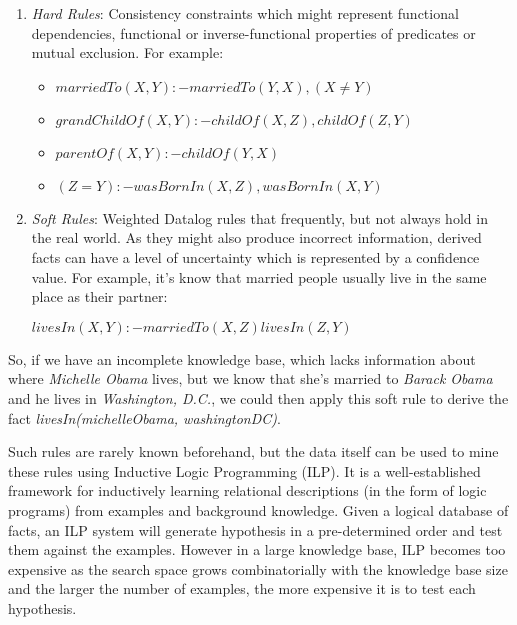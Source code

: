 \begin{enumerate}
 \item \emph{Hard Rules}: Consistency constraints which might represent functional dependencies, functional or
inverse-functional properties of predicates or mutual exclusion. For example:
    \begin{itemize}
      \item $ marriedTo(X,Y) :- marriedTo(Y,X),(X \neq Y)$
      \item $ grandChildOf(X,Y) :- childOf(X,Z),childOf(Z,Y)$
      \item $ parentOf(X,Y) :- childOf(Y,X)$
      \item $ (Z=Y) :- wasBornIn(X,Z),wasBornIn(X,Y)$
    \end{itemize}

 \item \emph{Soft Rules}: Weighted Datalog rules that frequently, but not always hold in the real world. As they
might also produce incorrect information, derived facts can have a level of uncertainty which is represented by a
confidence value. For example, it's know that married people usually live in the same place as their partner:
    \begin{center}
      $ livesIn(X,Y) :- marriedTo(X,Z)livesIn(Z,Y)$
    \end{center}
\end{enumerate}

So, if we have an incomplete knowledge base, which lacks information about where \emph{Michelle Obama} lives, but
we know that she's married to \emph{Barack Obama} and he lives in \emph{Washington, D.C.}, we could then apply this soft
rule to derive the fact \emph{livesIn(michelleObama, washingtonDC)}. 


Such rules are rarely known beforehand, but the data itself can be used to mine these rules using Inductive Logic
Programming (ILP). It is a well-established framework for inductively learning relational descriptions (in the form of
logic programs) from examples and background knowledge. Given a logical database of facts, an ILP system will generate
hypothesis in a pre-determined order and test them against the examples. However in a large knowledge base, ILP becomes
too expensive as the search space grows combinatorially with the knowledge base size and the larger the number of
examples, the more expensive it is to test each hypothesis.

